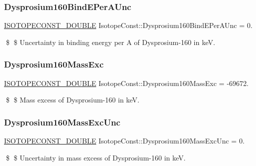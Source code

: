 \subsubsection{\texorpdfstring{Dysprosium160\+Bind\+E\+Per\+A\+Unc}{Dysprosium160BindEPerAUnc}}
{\footnotesize\ttfamily \mbox{\hyperlink{group___isotope_const-_macros_ga8f45a7272ce02c0b4c65c44636ed719a}{I\+S\+O\+T\+O\+P\+E\+C\+O\+N\+S\+T\+\_\+\+D\+O\+U\+B\+LE}} Isotope\+Const\+::\+Dysprosium160\+Bind\+E\+Per\+A\+Unc = 0.}

\$ \$ Uncertainty in binding energy per A of Dysprosium-\/160 in keV. \mbox{\label{group___isotope_const-_dysprosium-_dy160_ga79811352976e2c69f2fc593ac2006248}} 
\subsubsection{\texorpdfstring{Dysprosium160\+Mass\+Exc}{Dysprosium160MassExc}}
{\footnotesize\ttfamily \mbox{\hyperlink{group___isotope_const-_macros_ga8f45a7272ce02c0b4c65c44636ed719a}{I\+S\+O\+T\+O\+P\+E\+C\+O\+N\+S\+T\+\_\+\+D\+O\+U\+B\+LE}} Isotope\+Const\+::\+Dysprosium160\+Mass\+Exc = -\/69672.}

\$ \$ Mass excess of Dysprosium-\/160 in keV. \mbox{\label{group___isotope_const-_dysprosium-_dy160_ga3a8d617be28a87a672a2ea35888b9d35}} 
\subsubsection{\texorpdfstring{Dysprosium160\+Mass\+Exc\+Unc}{Dysprosium160MassExcUnc}}
{\footnotesize\ttfamily \mbox{\hyperlink{group___isotope_const-_macros_ga8f45a7272ce02c0b4c65c44636ed719a}{I\+S\+O\+T\+O\+P\+E\+C\+O\+N\+S\+T\+\_\+\+D\+O\+U\+B\+LE}} Isotope\+Const\+::\+Dysprosium160\+Mass\+Exc\+Unc = 0.}

\$ \$ Uncertainty in mass excess of Dysprosium-\/160 in keV. \mbox{\label{group___isotope_const-_dysprosium-_dy160_ga77934c91107d6f22b8bbfb0c4edbe417}} 
